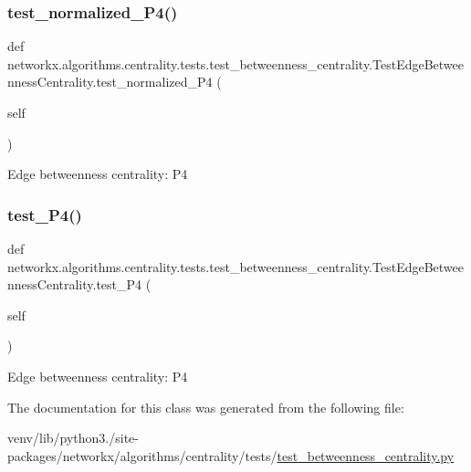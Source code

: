 \subsubsection{\texorpdfstring{test\+\_\+normalized\+\_\+\+P4()}{test\_normalized\_P4()}}
{\footnotesize\ttfamily def networkx.\+algorithms.\+centrality.\+tests.\+test\+\_\+betweenness\+\_\+centrality.\+Test\+Edge\+Betweenness\+Centrality.\+test\+\_\+normalized\+\_\+\+P4 (\begin{DoxyParamCaption}\item[{}]{self }\end{DoxyParamCaption})}

\begin{DoxyVerb}Edge betweenness centrality: P4\end{DoxyVerb}
 \mbox{\label{classnetworkx_1_1algorithms_1_1centrality_1_1tests_1_1test__betweenness__centrality_1_1TestEdgeBetweennessCentrality_a18c8527e27fbd1c9b665cbe7eb6813b4}} 
\subsubsection{\texorpdfstring{test\+\_\+\+P4()}{test\_P4()}}
{\footnotesize\ttfamily def networkx.\+algorithms.\+centrality.\+tests.\+test\+\_\+betweenness\+\_\+centrality.\+Test\+Edge\+Betweenness\+Centrality.\+test\+\_\+\+P4 (\begin{DoxyParamCaption}\item[{}]{self }\end{DoxyParamCaption})}

\begin{DoxyVerb}Edge betweenness centrality: P4\end{DoxyVerb}
 

The documentation for this class was generated from the following file\+:\begin{DoxyCompactItemize}
\item 
venv/lib/python3./site-\/packages/networkx/algorithms/centrality/tests/\hyperlink{test__betweenness__centrality_8py}{test\+\_\+betweenness\+\_\+centrality.\+py}\end{DoxyCompactItemize}
